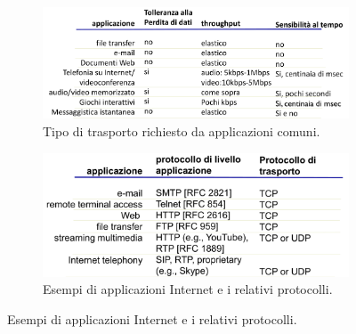 \documentclass[11pt, italian, openany]{book}
\begin{document}
\begin{sloppypar}
\begin{figure}[h!]
	\begin{subfigure}{0.49 \linewidth} \centering
		\includegraphics[scale=0.18]{images/trasporto-applicazioni-comuni.png}
		\caption{Tipo di trasporto richiesto da applicazioni comuni.}
	\end{subfigure}
	\begin{subfigure}{0.49 \linewidth} \centering
		\includegraphics[scale=0.18]{images/applicazioni-internet.png}
		\caption{Esempi di applicazioni Internet e i relativi protocolli.}
	\end{subfigure}
\end{figure}


\end{sloppypar}
\end{document}
